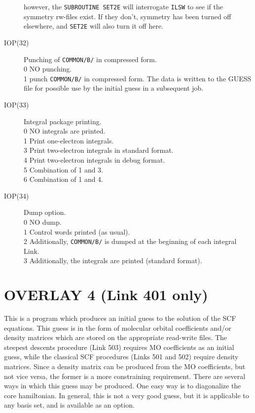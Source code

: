 \begin{description}
however, the {\tt SUBROUTINE SET2E} will interrogate {\tt ILSW} to
see if the symmetry rw-files exist. If they don't, symmetry
has been turned off elsewhere, and {\tt SET2E} will also
turn it off here.
\item[IOP(32)]  Punching of {\tt COMMON/B/} in compressed form.  \\
0  NO punching. \\
1  punch {\tt COMMON/B/} in compressed form. The data is written to 
the GUESS file for possible use by the initial guess
in a subsequent job.  \\
\item[IOP(33)]  Integral package printing.  \\
0  NO integrals are printed. \\
1  Print one-electron integrals. \\
3  Print two-electron integrals in standard format. \\
4  Print two-electron integrals in debug format. \\
5  Combination of 1 and 3. \\
6  Combination of 1 and 4. \\
\item[IOP(34)]  Dump option.  \\
0  NO dump. \\
1  Control words printed (as usual). \\
2  Additionally, {\tt COMMON/B/} is dumped at the beginning 
of each integral Link.  \\
3  Additionally, the integrals are printed (standard format). \\
\end{description}
\section{\sf OVERLAY 4 (Link 401 only)}
This is a program which produces an initial guess to the solution
of the SCF equations.  This guess is in the form of molecular orbital
coefficients and/or density matrices which are stored on the
appropriate read-write files.  The steepest descents procedure (Link
503) requires MO coefficients as an initial guess, while the classical 
SCF procedures (Links 501 and 502) require density matrices.  Since a
density matrix can be produced from the MO coefficients, but not vice
versa, the former is a more constraining requirement.
There are several ways in which this guess may be produced.  One
easy way is to diagonalize the core hamiltonian.  In general, this is
not a very good guess, but it is applicable to any basis set, and is
available as an option.

